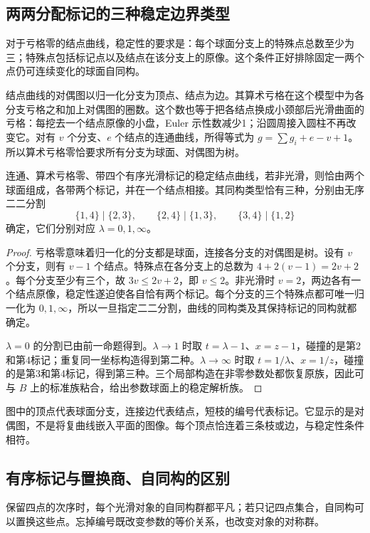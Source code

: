 \subsection{两两分配标记的三种稳定边界类型}
\label{g4:subsec:0605:04}
对于亏格零的结点曲线，稳定性的要求是：每个球面分支上的特殊点总数至少为三；特殊点包括标记点以及结点在该分支上的原像。这个条件正好排除固定一两个点仍可连续变化的球面自同构。

\ProseParagraphBreak

结点曲线的对偶图以归一化分支为顶点、结点为边。其算术亏格在这个模型中为各分支亏格之和加上对偶图的圈数。这个数也等于把各结点换成小颈部后光滑曲面的亏格：每挖去一个结点原像的小盘，Euler 示性数减少1；沿圆周接入圆柱不再改变它。对有 \(v\) 个分支、\(e\) 个结点的连通曲线，所得等式为 \(g=\sum g_i+e-v+1\)。所以算术亏格零恰要求所有分支为球面、对偶图为树。

\begin{proposition}
	\label{g4:prop:0605:three-boundaries}
	连通、算术亏格零、带四个有序光滑标记的稳定结点曲线，若非光滑，则恰由两个球面组成，各带两个标记，并在一个结点相接。其同构类型恰有三种，分别由无序二二分割
	\[
		\{1,4\}\mid\{2,3\},\qquad
		\{2,4\}\mid\{1,3\},\qquad
		\{3,4\}\mid\{1,2\}
	\]
	确定，它们分别对应 \(\lambda=0,1,\infty\)。
\end{proposition}
\begin{proof}
	亏格零意味着归一化的分支都是球面，连接各分支的对偶图是树。设有 \(v\) 个分支，则有 \(v-1\) 个结点。特殊点在各分支上的总数为 \(4+2(v-1)=2v+2\)。每个分支至少有三个，故 \(3v\le2v+2\)，即 \(v\le2\)。非光滑时 \(v=2\)，两边各有一个结点原像，稳定性遂迫使各自恰有两个标记。每个分支的三个特殊点都可唯一归一化为 \(0,1,\infty\)，所以一旦指定二二分割，曲线的同构类及其保持标记的同构就都确定。

	\(\lambda=0\) 的分割已由前一命题得到。\(\lambda\to1\) 时取 \(t=\lambda-1\)、\(x=z-1\)，碰撞的是第2和第4标记；重复同一坐标构造得到第二种。\(\lambda\to\infty\) 时取 \(t=1/\lambda\)、\(x=1/z\)，碰撞的是第3和第4标记，得到第三种。三个局部构造在非零参数处都恢复原族，因此可与 \(B\) 上的标准族粘合，给出参数球面上的稳定解析族。
\end{proof}



图中的顶点代表球面分支，连接边代表结点，短枝的编号代表标记。它显示的是对偶图，不是将复曲线嵌入平面的图像。每个顶点恰连着三条枝或边，与稳定性条件相符。

\subsection{有序标记与置换商、自同构的区别}
\label{g4:subsec:0605:05}
保留四点的次序时，每个光滑对象的自同构群都平凡；若只记四点集合，自同构可以置换这些点。忘掉编号既改变参数的等价关系，也改变对象的对称群。

